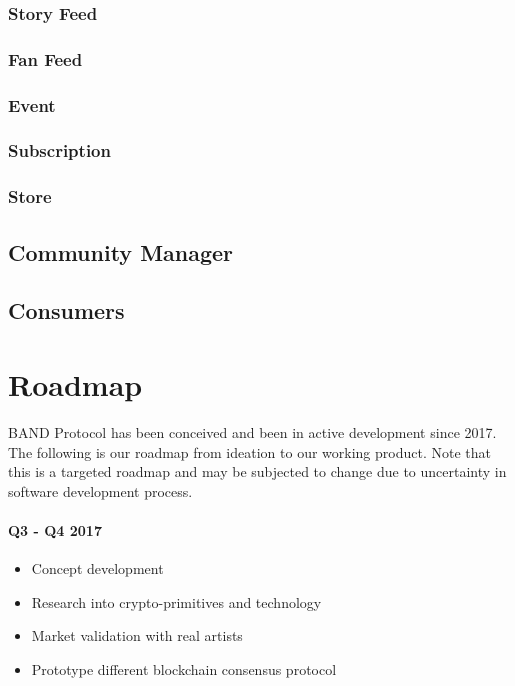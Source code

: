 \documentclass[letterpaper,11pt]{article}
\begin{document}
\subsubsection{Story Feed}

\subsubsection{Fan Feed}

\subsubsection{Event}

\subsubsection{Subscription}

\subsubsection{Store}

\subsection{Community Manager}

\subsection{Consumers}

\section{Roadmap}

BAND Protocol has been conceived and been in active development since 2017. The following is our roadmap from ideation to our working product. Note that this is a targeted roadmap and may be subjected to change due to uncertainty in software development process.

\paragraph{Q3 - Q4 2017}
\begin{itemize}
\itemsep0em
\item Concept development
\item Research into crypto-primitives and technology
\item Market validation with real artists
\item Prototype different blockchain consensus protocol
\end{itemize}
\end{document}
